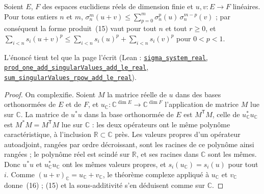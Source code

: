 \begin{encadre}
\begin{theoreme}
Soient $E$, $F$ des espaces euclidiens réels de dimension finie et $u, v : E \to F$ linéaires. Pour tous entiers $n$ et $m$, $\sigma_n^m(u+v) \leq \sum_{p=0}^{m} \sigma_n^p(u)\,\sigma_n^{m-p}(v)$ ; par conséquent la forme produit~(15) vaut pour tout $n$ et tout $r \geq 0$, et $\sum_{i<n} s_i(u+v)^p \leq \sum_{i<n} s_i(u)^p + \sum_{i<n} s_i(v)^p$ pour $0 < p < 1$.
\end{theoreme}
\end{encadre}
L'énoncé tient tel que la page l'écrit (Lean : \href{\leanblob/LinearAlgebra/Folder1.lean}{\texttt{sigma\_system\_real}, \texttt{prod\_one\_add\_singularValues\_add\_le\_real}, \texttt{sum\_singularValues\_rpow\_add\_le\_real}}).
\begin{proof}
On complexifie. Soient $M$ la matrice réelle de $u$ dans des bases orthonormées de $E$ et de $F$, et $u_{\mathbb C} : \mathbb C^{\dim E} \to \mathbb C^{\dim F}$ l'application de matrice $M$ lue sur $\mathbb C$. La matrice de $u^*u$ dans la base orthonormée de $E$ est $M^{\mathsf T} M$, celle de $u_{\mathbb C}^* u_{\mathbb C}$ est $M^* M = M^{\mathsf T} M$ lue sur $\mathbb C$ : les deux opérateurs ont le même polynôme caractéristique, à l'inclusion $\mathbb R \subset \mathbb C$ près. Les valeurs propres d'un opérateur autoadjoint, rangées par ordre décroissant, sont les racines de ce polynôme ainsi rangées ; le polynôme réel est scindé sur $\mathbb R$, et ses racines dans $\mathbb C$ sont les mêmes. Donc $u^*u$ et $u_{\mathbb C}^*u_{\mathbb C}$ ont les mêmes valeurs propres, et $s_i(u_{\mathbb C}) = s_i(u)$ pour tout $i$. Comme $(u+v)_{\mathbb C} = u_{\mathbb C} + v_{\mathbb C}$, le théorème complexe appliqué à $u_{\mathbb C}$ et $v_{\mathbb C}$ donne~(16) ; (15) et la sous-additivité s'en déduisent comme sur $\mathbb C$.
\end{proof}

